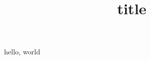 \documentclass{jsarticle}
\title{title}
\author{}
\date{}
\begin{document}
\maketitle

hello, world
\end{document}
